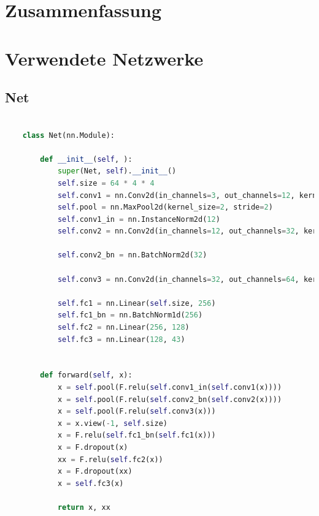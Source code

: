 \documentclass[twoside, 12pt,a4paper]{article}
\numberwithin{equation}{section}
\begin{document}
	\section{Zusammenfassung} \label{chapter_conclusion}
	
	\printglossaries
	\newpage
	\appendix
	\section{Verwendete Netzwerke}
	\subsection{Net}
	
	\begin{lstlisting}[language=Python, caption=Kleines Netzwerk]
	
	class Net(nn.Module):
	
		def __init__(self, ):
			super(Net, self).__init__()
			self.size = 64 * 4 * 4
			self.conv1 = nn.Conv2d(in_channels=3, out_channels=12, kernel_size=5, padding=2)
			self.pool = nn.MaxPool2d(kernel_size=2, stride=2)
			self.conv1_in = nn.InstanceNorm2d(12)
			self.conv2 = nn.Conv2d(in_channels=12, out_channels=32, kernel_size=5, padding=2)
			
			self.conv2_bn = nn.BatchNorm2d(32)
			
			self.conv3 = nn.Conv2d(in_channels=32, out_channels=64, kernel_size=5, padding=2)
			
			self.fc1 = nn.Linear(self.size, 256)
			self.fc1_bn = nn.BatchNorm1d(256)
			self.fc2 = nn.Linear(256, 128)
			self.fc3 = nn.Linear(128, 43)
		
	
		def forward(self, x):
			x = self.pool(F.relu(self.conv1_in(self.conv1(x))))
			x = self.pool(F.relu(self.conv2_bn(self.conv2(x))))
			x = self.pool(F.relu(self.conv3(x)))
			x = x.view(-1, self.size)
			x = F.relu(self.fc1_bn(self.fc1(x)))
			x = F.dropout(x)
			xx = F.relu(self.fc2(x))
			x = F.dropout(xx)
			x = self.fc3(x)
			
			return x, xx
	
	\end{lstlisting}
	
\end{document}
